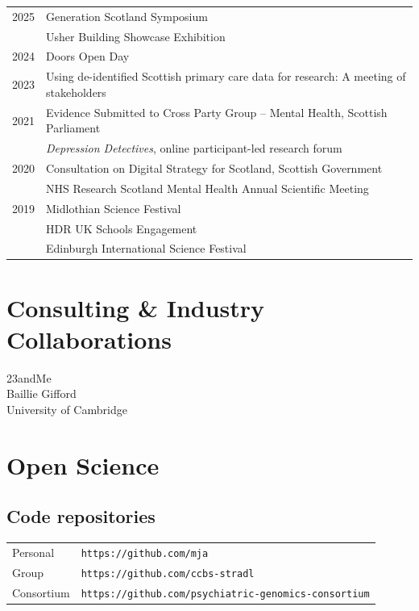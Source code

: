 \documentclass[11pt]{article}
\begin{document}
\begin{tabular}{p{3cm}p{12cm}}

2025 & Generation Scotland Symposium \\
     & Usher Building Showcase Exhibition \\
2024 & Doors Open Day \\
2023 & Using de-identified Scottish primary care data for research: A meeting of stakeholders \\
2021 & Evidence Submitted to Cross Party Group -- Mental Health, Scottish Parliament \\
     & \emph{Depression Detectives}, online participant-led research forum \\
2020 & Consultation on Digital Strategy for Scotland, Scottish Government \\
     & NHS Research Scotland Mental Health Annual Scientific Meeting \\
2019 & Midlothian Science Festival \\
     & HDR UK Schools Engagement \\
     & Edinburgh International Science Festival

\end{tabular}

\section*{Consulting \& Industry Collaborations}

23andMe \\
Baillie Gifford \\
University of Cambridge

\section*{Open Science}

\subsection*{Code repositories}

\begin{tabular}{p{3cm}p{12cm}}

Personal &  \texttt{https://github.com/mja} \\
Group &  \texttt{https://github.com/ccbs-stradl} \\
Consortium & \texttt{https://github.com/psychiatric-genomics-consortium}

\end{tabular}
\end{document}
